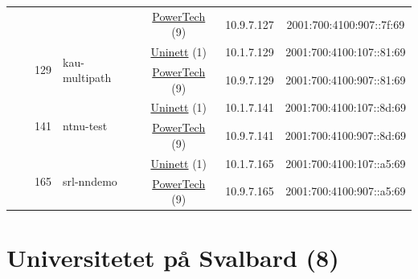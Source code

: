 \begin{small}
\begin{center}
\begin{longtable}{|c|c|c|c|c|c|c|c|}
  &  &  &  & \multicolumn{2}{|c|}{\tiny{\href{http://www.powertech.no}{PowerTech} (9)}} & \tiny{10.9.7.127} & \tiny{2001:700:4100:907::7f:69} \\* \cline{3-3}\cline{4-4}\cline{5-5}\cline{6-6}\cline{7-7}\cline{8-8}
  &  & \multirow{2}{*}{\tiny{129}} & \multicolumn{1}{|l|}{\multirow{2}{*}{\tiny{kau-multipath}}} & \multicolumn{2}{|c|}{\tiny{\href{https://www.uninett.no}{Uninett} (1)}} & \tiny{10.1.7.129} & \tiny{2001:700:4100:107::81:69} \\* \cline{5-5}\cline{6-6}\cline{7-7}\cline{8-8}
  &  &  &  & \multicolumn{2}{|c|}{\tiny{\href{http://www.powertech.no}{PowerTech} (9)}} & \tiny{10.9.7.129} & \tiny{2001:700:4100:907::81:69} \\* \cline{3-3}\cline{4-4}\cline{5-5}\cline{6-6}\cline{7-7}\cline{8-8}
  &  & \multirow{2}{*}{\tiny{141}} & \multicolumn{1}{|l|}{\multirow{2}{*}{\tiny{ntnu-test}}} & \multicolumn{2}{|c|}{\tiny{\href{https://www.uninett.no}{Uninett} (1)}} & \tiny{10.1.7.141} & \tiny{2001:700:4100:107::8d:69} \\* \cline{5-5}\cline{6-6}\cline{7-7}\cline{8-8}
  &  &  &  & \multicolumn{2}{|c|}{\tiny{\href{http://www.powertech.no}{PowerTech} (9)}} & \tiny{10.9.7.141} & \tiny{2001:700:4100:907::8d:69} \\* \cline{3-3}\cline{4-4}\cline{5-5}\cline{6-6}\cline{7-7}\cline{8-8}
  &  & \multirow{2}{*}{\tiny{165}} & \multicolumn{1}{|l|}{\multirow{2}{*}{\tiny{srl-nndemo}}} & \multicolumn{2}{|c|}{\tiny{\href{https://www.uninett.no}{Uninett} (1)}} & \tiny{10.1.7.165} & \tiny{2001:700:4100:107::a5:69} \\* \cline{5-5}\cline{6-6}\cline{7-7}\cline{8-8}
  &  &  &  & \multicolumn{2}{|c|}{\tiny{\href{http://www.powertech.no}{PowerTech} (9)}} & \tiny{10.9.7.165} & \tiny{2001:700:4100:907::a5:69} \\ \hline
\end{longtable}
\end{center}
\end{small}



\section{Universitetet på Svalbard (8)}
\label{sec:UNIS}

